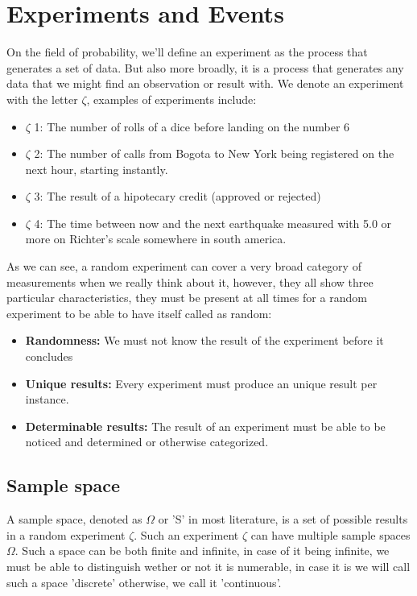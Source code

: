 \documentclass[11pt,fleqn]{book} %
\begin{document}
\section{Experiments and Events}

On the field of probability, we'll define an experiment as the process that generates a set
of data. But also more broadly, it is a process that generates any data that we might find
an observation or result with. We denote an experiment with the letter $ \zeta $, examples
of experiments include:

\begin{itemize}
    \item $\zeta$ 1: The number of rolls of a dice before landing on the number 6
    \item $\zeta$ 2: The number of calls from Bogota to New York being registered on the next hour, starting instantly.
    \item $\zeta$ 3: The result of a hipotecary credit (approved or rejected)
    \item $\zeta$ 4: The time between now and the next earthquake measured with 5.0 or more on Richter's scale somewhere in south america.
\end{itemize}

As we can see, a random experiment can cover a very broad category of measurements when we really think about it, however,
they all show three particular characteristics, they must be present at all times for a random experiment to be able to 
have itself called as random:

\begin{itemize}
    \item \textbf{Randomness: }We must not know the result of the experiment before it concludes
    \item \textbf{Unique results: }Every experiment must produce an unique result per instance.
    \item \textbf{Determinable results: }The result of an experiment must be able to be noticed and determined or otherwise categorized.
\end{itemize}

\subsection{Sample space}

A sample space, denoted as $ \Omega  $ or 'S' in most literature, is a set of possible results in a random experiment 
$ \zeta $. Such an experiment $ \zeta $ can have multiple sample spaces $ \Omega $. Such a space can be both finite and infinite,
in case of it being infinite, we must be able to distinguish wether or not it is numerable, in case it is we will
call such a space 'discrete' otherwise, we call it 'continuous'.
\end{document}
